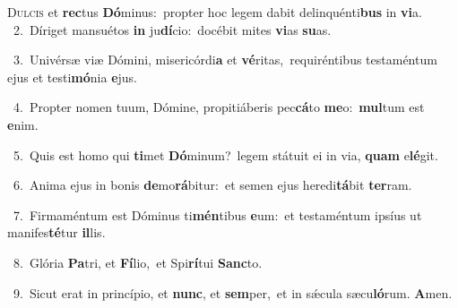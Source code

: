 \lettrine{\initial\textcolor{\initialcolor}{D}}{ulcis} et \textbf{rec}\-tus \textbf{Dó}\-minus:~\star propter hoc legem dabit delinquénti\textbf{bus} in \textbf{vi}\-a.\\
{\numbfont\textcolor{\numbcolor}{~2.}}~Díriget mansuétos \textbf{in} ju\-\textbf{dí}\-cio:~\star docébit mites \textbf{vi}\-as \textbf{su}\-as.\par
{\numbfont\textcolor{\numbcolor}{~3.}}~Univérsæ viæ Dómini, misericórdi\textbf{a} et \textbf{vé}\-ritas,~\star requiréntibus testaméntum ejus et testi\-\textbf{mó}\-nia \textbf{e}\-jus.\par
{\numbfont\textcolor{\numbcolor}{~4.}}~Propter nomen tuum, Dómine, propitiáberis pec\-\textbf{cá}\-to \textbf{me}\-o:~\star \textbf{mul}\-tum est \textbf{e}\-nim.\par
{\numbfont\textcolor{\numbcolor}{~5.}}~Quis est homo qui \textbf{ti}\-met \textbf{Dó}\-minum?~\star legem státuit ei in via, \textbf{quam} e\-\textbf{lé}\-git.\par
{\numbfont\textcolor{\numbcolor}{~6.}}~Anima ejus in bonis \textbf{de}\-mo\-\textbf{rá}\-bitur:~\star et semen ejus heredi\-\textbf{tá}\-bit \textbf{ter}\-ram.\par
{\numbfont\textcolor{\numbcolor}{~7.}}~Firmaméntum est Dóminus ti\-\textbf{mén}\-tibus \textbf{e}\-um:~\star et testaméntum ipsíus ut manifes\-\textbf{té}\-tur \textbf{il}\-lis.\par
{\numbfont\textcolor{\numbcolor}{~8.}}~Glória \textbf{Pa}\-tri, et \textbf{Fí}\-lio,~\star et Spi\-\textbf{rí}\-tui \textbf{Sanc}\-to.\par
{\numbfont\textcolor{\numbcolor}{~9.}}~Sicut erat in princípio, et \textbf{nunc}\-, et \textbf{sem}\-per,~\star et in sǽcula sæcu\-\textbf{ló}\-rum. \textbf{A}\-men.\par
